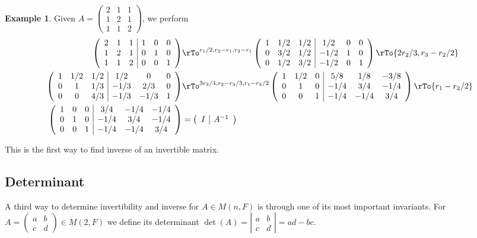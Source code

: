 \documentclass[12pt]{amsart}
\theoremstyle{definition}
\newtheorem{example}[theorem]{Example}
\begin{document}
\begin{example}\label{algorithminvertsmatrix} Given $A = \left(\begin{array}{ccc} 2 & 1 & 1\\ 1 & 2 & 1 \\1 & 1 & 2 \end{array}\right)$, we perform
\begin{align*}
\left(\begin{array}{ccc|ccc} 2 & 1 & 1 & 1 & 0 & 0 \\ 1 & 2 & 1 & 0 & 1 & 0 \\ 1 & 1 & 2 & 0 & 0 & 1 \end{array}\right) & \rTo^{r_1/2, r_2-r_1, r_3 - r_1} \left(\begin{array}{ccc|ccc} 1 & 1/2 & 1/2 & 1/2 & 0 & 0 \\ 0 & 3/2 & 1/2 & -1/2 & 1 & 0 \\ 0 & 1/2 & 3/2 & -1/2 & 0 & 1 \end{array}\right) \rTo{2r_2/3, r_3 - r_2/2} \\
\left(\begin{array}{ccc|ccc} 1 & 1/2 & 1/2 & 1/2 & 0 & 0 \\ 0 & 1 & 1/3 & -1/3 & 2/3 & 0 \\ 0 & 0 & 4/3 & -1/3 & -1/3 & 1 \end{array}\right) & \rTo^{3r_3/4, r_2 -r_3/3, r_1 - r_3/2} \left(\begin{array}{ccc|ccc} 1 & 1/2 & 0 & 5/8 & 1/8 & -3/8 \\ 0 & 1 & 0 & -1/4 & 3/4 & -1/4 \\ 0 & 0 & 1 & -1/4 & -1/4 & 3/4 \end{array}\right) \rTo{r_1 - r_2/2} \\
\left(\begin{array}{ccc|ccc} 1 & 0 & 0 & 3/4 & -1/4 & -1/4 \\ 0 & 1 & 0 & -1/4 & 3/4 & -1/4 \\ 0 & 0 & 1 & -1/4 & -1/4 & 3/4 \end{array}\right) & = \left(\begin{array}{c|c} I & A^{-1} \end{array}\right)
\end{align*}

This is the first way to find inverse of an invertible matrix.
\end{example}

\subsection{Determinant} A third way to determine invertibility and inverse for $A \in M(n, F)$ is through one of its most important invariants.
\dfn For $A = \left(\begin{array}{cc} a & b \\ c & d \end{array}\right) \in M(2, F)$ we define its determinant $\det(A) = \left|\begin{array}{cc} a & b \\ c & d \end{array}\right| = ad -bc$.
\end{document}
